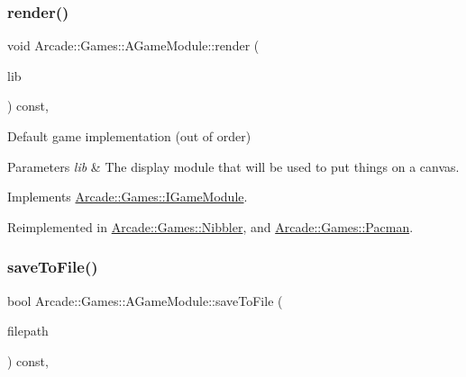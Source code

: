 \subsubsection{\texorpdfstring{render()}{render()}}
{\footnotesize\ttfamily void Arcade\+::\+Games\+::\+A\+Game\+Module\+::render (\begin{DoxyParamCaption}\item[{\mbox{\hyperlink{classArcade_1_1Display_1_1IDisplayModule}{Arcade\+::\+Display\+::\+I\+Display\+Module}} \&}]{lib }\end{DoxyParamCaption}) const\hspace{0.3cm}{\ttfamily [override]}, {\ttfamily [virtual]}}



Default game implementation (out of order) 


\begin{DoxyParams}{Parameters}
{\em lib} & The display module that will be used to put things on a canvas. \\
\hline
\end{DoxyParams}


Implements \mbox{\hyperlink{classArcade_1_1Games_1_1IGameModule_afd5ec66681e77038e3d4dc17f43e1ee9}{Arcade\+::\+Games\+::\+I\+Game\+Module}}.



Reimplemented in \mbox{\hyperlink{classArcade_1_1Games_1_1Nibbler_afd52ee2fad66523b58f94f9eb582145e}{Arcade\+::\+Games\+::\+Nibbler}}, and \mbox{\hyperlink{classArcade_1_1Games_1_1Pacman_ab1a7408f265efbef12b4f9d1a6fb4512}{Arcade\+::\+Games\+::\+Pacman}}.

\mbox{\label{classArcade_1_1Games_1_1AGameModule_a16425d9ca7518acbc60fbece4a974009}} 
\subsubsection{\texorpdfstring{saveToFile()}{saveToFile()}\hspace{0.1cm}{\footnotesize\ttfamily [1/2]}}
{\footnotesize\ttfamily bool Arcade\+::\+Games\+::\+A\+Game\+Module\+::save\+To\+File (\begin{DoxyParamCaption}\item[{const std\+::string \&}]{filepath }\end{DoxyParamCaption}) const\hspace{0.3cm}{\ttfamily [final]}, {\ttfamily [virtual]}}



